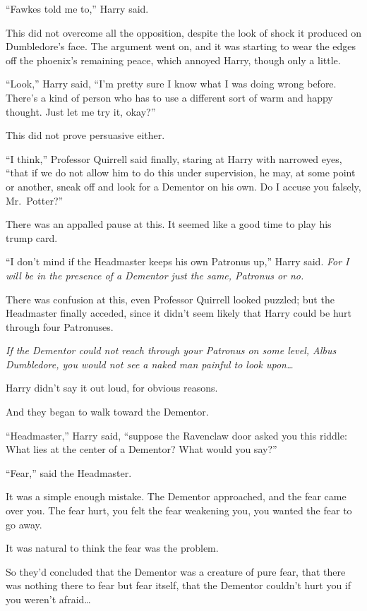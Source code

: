 ``Fawkes told me to,'' Harry said.

This did not overcome all the opposition, despite the look of shock it
produced on Dumbledore's face. The argument went on, and it was starting
to wear the edges off the phoenix's remaining peace, which annoyed
Harry, though only a little.

``Look,'' Harry said, ``I'm pretty sure I know what I was doing wrong
before. There's a kind of person who has to use a different sort of warm
and happy thought. Just let me try it, okay?''

This did not prove persuasive either.

``I think,'' Professor Quirrell said finally, staring at Harry with
narrowed eyes, ``that if we do not allow him to do this under
supervision, he may, at some point or another, sneak off and look for a
Dementor on his own. Do I accuse you falsely, Mr.~Potter?''

There was an appalled pause at this. It seemed like a good time to play
his trump card.

``I don't mind if the Headmaster keeps his own Patronus up,'' Harry
said. \emph{For I will be in the presence of a Dementor just the same,
Patronus or no.}

There was confusion at this, even Professor Quirrell looked puzzled; but
the Headmaster finally acceded, since it didn't seem likely that Harry
could be hurt through four Patronuses.

\emph{If the Dementor could not reach through your Patronus on some
level, Albus Dumbledore, you would not see a naked man painful to look
upon\ldots{}}

Harry didn't say it out loud, for obvious reasons.

And they began to walk toward the Dementor.

``Headmaster,'' Harry said, ``suppose the Ravenclaw door asked you this
riddle: What lies at the center of a Dementor? What would you say?''

``Fear,'' said the Headmaster.

It was a simple enough mistake. The Dementor approached, and the fear
came over you. The fear hurt, you felt the fear weakening you, you
wanted the fear to go away.

It was natural to think the fear was the problem.

So they'd concluded that the Dementor was a creature of pure fear, that
there was nothing there to fear but fear itself, that the Dementor
couldn't hurt you if you weren't afraid\ldots{}

